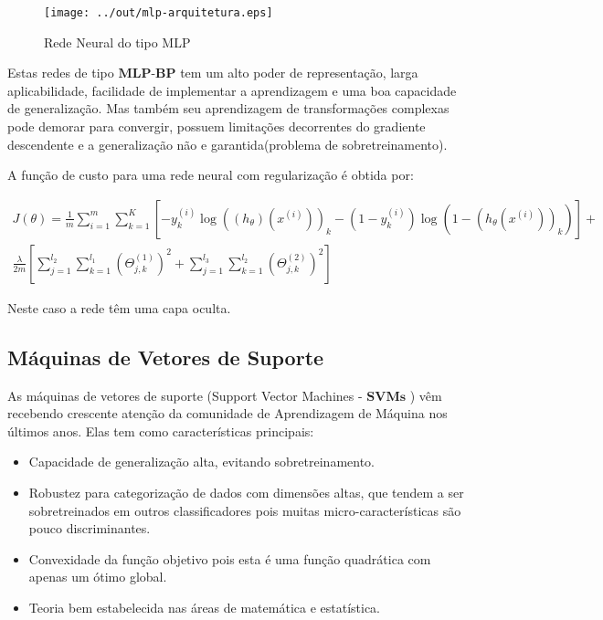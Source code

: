 \documentclass[12pt]{article}
\begin{document}
\begin{figure}[h]
\centering
\texttt{[image: ../out/mlp-arquitetura.eps]}
\caption{Rede Neural do tipo MLP}
\label{fig:mlp}
\end{figure} 

Estas redes de tipo $\textbf{MLP-BP}$ tem um alto poder de representação, larga aplicabilidade, facilidade de implementar a aprendizagem e uma boa capacidade de generalização. Mas também seu aprendizagem de transformações complexas pode demorar para convergir, possuem limitações decorrentes do gradiente descendente e a generalização não e garantida(problema de sobretreinamento).

A função de custo para uma rede neural com regularização é obtida por:

\begin{equation*}
\begin{split}
J(\theta) = \frac{1}{m}\sum_{i=1}^{m}\sum_{k=1}^{K} [-y_k^{(i)}\log((h_{\theta})(x^{(i)}))_k -
(1-y_k^{(i)})\log(1-(h_{\theta}(x^{(i)}))_k) ]
+ \\ \frac{\lambda}{2m}[\sum_{j=1}^{l_2}\sum_{k=1}^{l_1}(\Theta_{j,k}^{(1)})^{2} + \sum_{j=1}^{l_3}\sum_{k=1}^{l_2}(\Theta_{j,k}^{(2)})^{2}] 
\end{split}
\end{equation*}

Neste caso a rede têm uma capa oculta.

\subsection{Máquinas de Vetores de Suporte}

As máquinas de vetores de suporte (Support Vector Machines - $\textbf{SVMs}$ ) vêm recebendo crescente atenção da comunidade de Aprendizagem de Máquina nos últimos anos. Elas tem como características principais:
\begin{itemize}
    \item Capacidade de generalização alta, evitando sobretreinamento.
    \item Robustez para categorização de dados com dimensões altas, que tendem a ser sobretreinados em outros classificadores pois muitas micro-características são pouco discriminantes.
    \item Convexidade da função objetivo pois esta é uma função quadrática com apenas um ótimo global. 
    \item Teoria bem estabelecida nas áreas de matemática e estatística.
\end{itemize}
\end{document}
